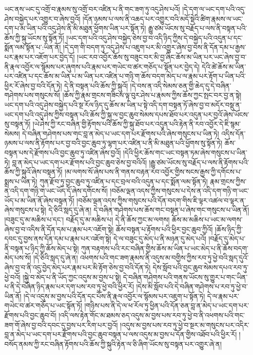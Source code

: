 ཡང་ནས་ཡང་དུ་འགྲོ་བ་རྣམས་སུ་འགྲོ་བར་འཛིན་པ་ནི་གང་ཟག་ཏུ་འདུ་ཤེས་པའོ། །དེ་དག་ལ་ཡང་དག་པའི་འདུ་ཤེས་བསྐྱེད་པར་འགྱུར་བ་ཞེས་བྱའོ། །དོན་ཉམས་པ་ལས་ནི་འཆད་པར་འགྱུར་བའི་མདོ་སྡེའི་ཚིག་རྣམས་ལ་ཡང་དག་པ་མ་ཡིན་པའི་འདུ་ཤེས་ནི་མི་མཐུན་ཕྱོགས་ཡིན་པར་སྟོན་ཏེ། རྒྱུ་ཙམ་ཡོངས་སུ་བརྗོད་པ་ལས་ནི་བསྟན་པའི་ཆོས་ཀྱི་སྐུ་ཡོངས་སུ་སྟོན་ཏོ། །ཡང་དག་པའི་འདུ་ཤེས་བསྐྱེད་ཅེས་བྱ་བ་འདི་ཉིད་ཀྱིས་དེ་བསྐྱེད་པའི་འདུན་པ་དང་སྨོན་ལམ་སྟོན་པ་:ཡིན་ནོ། །དེ་དག་གི་བདག་ཏུ་འདུ་ཤེས་པ་འཇུག་པར་མི་འགྱུར་ཞེས་བྱ་བས་ནི་དོན་དམ་པ་རྒྱས་པར་རྣམ་པར་འཇོག་པར་བྱེད་དོ། །ཡང་རབ་འབྱོར་ཆོས་སུ་བཟུང་བར་མི་བྱ་ཞིང་ཆོས་མ་ཡིན་པར་ཡང་ཞེས་བྱ་བ་ནི་རྣལ་འབྱོར་ལ་སྙོམས་པར་ཞུགས་པའི་རྣམ་པར་གཡེང་བ་ཚར་གཅོད་པ་སྟོན་པར་བྱེད་དེ། དེའི་ཚེ་ཆོས་མ་ཡིན་པར་འཛིན་པ་དང་ཆོས་མ་ཡིན་པ་མ་ཡིན་པར་འཛིན་པ་གཉི་ག་ཆོས་བདག་མེད་པ་ལ་རྣམ་པར་རྟོག་པ་ཡིན་པའི་ཕྱིར་རོ་ཞེས་བྱ་བའི་དོན་ཏེ། དེ་ནི་བསྟན་པའི་ཆོས་ཀྱི་སྐུའོ། །དེ་བས་ན་འདི་སེམས་ཅན་གྱི་ཆེད་དུ་དེ་བཞིན་གཤེགས་པས་གསུངས་སོ། །ཆོས་ཀྱི་རྣམ་གྲངས་གཟིངས་ལྟ་བུར་ཤེས་པ་རྣམས་ཀྱིས་ཆོས་ཀྱང་སྤང་བར་བྱ་ན་སྟེ། ཡང་དག་པའི་འདུ་ཤེས་བསྐྱེད་པའི་སྔ་རོལ་ཉིད་དུ་ཆོས་མ་ཡིན་པ་སྟེ་འདི་དག་བསྟན་ཏོ་ཞེས་བྱ་བ་མདོར་བསྡུ་ན་ཡང་དག་པའི་འདུ་ཤེས་ཀྱིས་བསྟན་པའི་ཆོས་ཀྱི་སྐུ་ལ་བྱང་ཆུབ་སེམས་དཔས་ཐོབ་པར་འདུན་པར་བྱའོ་ཞེས་ཡོངས་སུ་བསྟན་ཏོ། །ཡེ་ཤེས་ཀྱི་རང་བཞིན་གྱི་རྟོགས་པའི་ཆོས་ཀྱི་སྐུ་ཐོབ་པར་འདུན་པའི་རྟེན་ནི་རབ་འབྱོར་དེ་ཇི་སྙམ་སེམས། དེ་བཞིན་གཤེགས་པས་གང་བླ་ན་མེད་པ་ཡང་དག་པར་རྫོགས་པའི་ཞེས་གསུངས་པ་ཡིན་ཏེ། འདིས་དོན་ཉམས་པ་ལས་ནི་རྟོགས་པར་བྱ་བའི་བྱང་ཆུབ་ཏུ་ལྷག་པར་འཛིན་པ་ནི་མི་མཐུན་པའི་ཕྱོགས་སུ་སྟོན་ཏེ། ཆོས་བསྟན་པས་དེ་རྫོགས་པའི་བྱང་ཆུབ་ཏུ་འཛིན་ཞེས་བྱའོ། །དེའི་ཕྱིར་ཆོས་གང་ཡང་བསྟན་ཏམ་ཞེས་གསུངས་པ་ཡིན་ཏེ། བླ་ན་མེད་པ་ཡང་དག་པར་རྫོགས་པའི་བྱང་ཆུབ་ཅེས་བྱ་བའིའོ། །རྒྱུ་ཙམ་ཡོངས་སུ་བརྗོད་པ་ལས་ནི་རྟོགས་པའི་ཆོས་ཀྱི་སྐུའོ་ཞེས་བསྟན་ཏོ། །མ་ལགས་སོ་ཞེས་པས་ནི་གནས་བརྟན་རབ་འབྱོར་གྱིས་སངས་རྒྱས་ཀྱི་དགོངས་པ་སྨྲས་པ་ཡིན་ཏེ། ཀུན་རྫོབ་ཏུ་བྱང་ཆུབ་ཏུ་འཛིན་པ་དང་བྲལ་བའི་འདུན་པ་དང་སྨོན་ལམ་སྟོན་ཏེ། རྣམ་གྲངས་ཀྱིས་ན་འདི་དག་གཉི་ག་ཡང་ཡོད་དོ་ཞེས་དགོངས་སོ། །བཅོམ་ལྡན་འདས་ཀྱིས་གསུངས་པ་དེས་ན་འདི་དག་གཉི་ག་ཡང་ཡོད་པ་མ་ཡིན་ནོ་ཞེས་བསྟན་ཏོ། །བཅོམ་ལྡན་འདས་ཀྱིས་གསུངས་པའི་དོན་བདག་གིས་ཇི་ལྟར་འཚལ་བ་ལྟར་ན་ཞེས་གསུངས་པ་སྟེ། དེ་ཅིའི་སླད་དུ་ཞེ་ན། དེ་བཞིན་གཤེགས་པས་ཆོས་གང་བསྟན་པ་ཞེས་གང་གསུངས་པ་ཡིན་ནོ། །བཟུང་དུ་མ་མཆིས་པ་དང་། བརྗོད་དུ་མ་མཆིས་པ། དེ་ནི་ཆོས་ཀྱང་མ་ལགས། ཆོས་མ་མཆིས་པ་ཡང་མ་ལགས་ཞེས་བྱ་བ་འདིས་ནི་དོན་དམ་པ་རྣམ་པར་འཇོག་སྟེ། ཆོས་བསྟན་པ་རྟོགས་པའི་ཕྱིར་བྱང་ཆུབ་ཀྱིའོ། །ཆོས་ཉིད་ཀྱི་དབང་དུ་བྱས་ནས་དོན་དམ་པ་རྣམ་པར་འཇོག་སྟེ། དེ་ལ་བཟུང་དུ་མེད་པ་ནི་མཉན་དུ་མེད་པའོ། །བརྗོད་དུ་མེད་པ་ནི་བསྟན་པ་ཉིད་ཀྱི་ཆོས་མེད་པ་སྟེ། ཀུན་བརྟགས་པའི་རང་བཞིན་གྱིས་ཆོས་མ་ཡིན་པ་ཡང་མེད་པ་ནི་ཆོས་བདག་མེད་པས་སོ། །དེ་ཅིའི་སླད་དུ་ཞེ་ན། འཕགས་པའི་གང་ཟག་རྣམས་ནི་འདུས་མ་བགྱིས་ཀྱིས་རབ་ཏུ་ཕྱེ་བའི་སླད་དུའོ་ཞེས་བྱ་བ་ནི་འདུ་བྱེད་མེད་པར་རྣམ་པར་མི་རྟོག་ཅེས་བྱ་བའི་དོན་ཏེ། དེས་སློབ་པའི་བྱང་ཆུབ་སེམས་དཔའ་རབ་ཏུ་ཕྱེ་བའོ། །སྐྱེ་བ་མེད་པ་ནི་ཡོད་ཀྱང་འདུས་མ་བྱས་པ་སྟེ། དེ་བཞིན་གཤེགས་པའི་གནས་ཡོངས་སུ་གྱུར་པ་གང་ཡིན་པ་ནི་དེ་བཞིན་ཉིད་རྣམ་པར་དག་པས་རབ་ཏུ་ཕྱེ་བའི་ཕྱིར་རོ། །དེས་མི་སློབ་པའི་དེ་བཞིན་གཤེགས་པ་རབ་ཏུ་ཕྱེ་བ་ཡིན་ནོ། །དེ་ལ་འདུས་མ་བྱས་པའི་དོན་དང་པོས་ནི་རྣལ་འབྱོར་ལ་སྙོམས་པར་འཇུག་པ་སྟོན་ཏེ། དེ་ལ་རྣམ་པར་གཡེང་བ་ཚར་གཅོད་པ་ཡང་སྟོན་ཏོ། །གཉིས་པས་ནི་དེ་ལ་ཕ་རོལ་ཏུ་ཕྱིན་པའི་དོན་ཅན་བླ་ན་མེད་པ་ཡང་དག་པར་རྫོགས་པའི་བྱང་ཆུབ་བོ། །འདི་ལས་རྟེན་གོང་མ་ཐམས་ཅད་འདུས་མ་བྱས་པས་རབ་ཏུ་ཕྱེ་བ་ནི་འཕགས་པའི་གང་ཟག་གོ་ཞེས་བྱ་བའི་དབང་དུ་བྱས་པར་རིག་པར་བྱའོ། །འདུས་མ་བྱས་པས་རབ་ཏུ་ཕྱེ་བ་སྔར་མ་གསུངས་པར་འདིར་བླ་ན་མེད་པ་ཡང་དག་པར་རྫོགས་པའི་བྱང་ཆུབ་བསྟན་པ་ལས་འདུས་མ་བྱས་པ་དོན་གྱིས་འཐོབ་པའི་ཕྱིར་རོ། །བསོད་ནམས་ཀྱི་རང་བཞིན་རྟོགས་པའི་ཆོས་ཀྱི་སྐུའི་རྟེན་ལ་ཅི་ཞིག་ཡོངས་སུ་བསྟན་པར་འགྱུར་ཞེ་ན། 